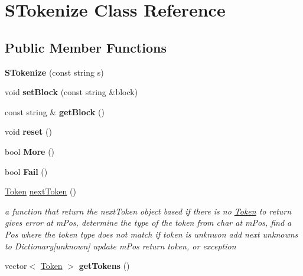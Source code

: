 \hypertarget{classSTokenize}{\section{S\-Tokenize Class Reference}
\label{classSTokenize}
}
\subsection*{Public Member Functions}
\begin{DoxyCompactItemize}
\item 
\hypertarget{classSTokenize_a6580cda9efc651908d5626b3e66a163c}{{\bfseries S\-Tokenize} (const string s)}\label{classSTokenize_a6580cda9efc651908d5626b3e66a163c}

\item 
\hypertarget{classSTokenize_ae0f9e9a36380b32b7d957649b246d3af}{void {\bfseries set\-Block} (const string \&block)}\label{classSTokenize_ae0f9e9a36380b32b7d957649b246d3af}

\item 
\hypertarget{classSTokenize_afebcdcb4e3710479e4ebec169aa379d6}{const string \& {\bfseries get\-Block} ()}\label{classSTokenize_afebcdcb4e3710479e4ebec169aa379d6}

\item 
\hypertarget{classSTokenize_adaa02543ad76313875bf18b9409a48c8}{void {\bfseries reset} ()}\label{classSTokenize_adaa02543ad76313875bf18b9409a48c8}

\item 
\hypertarget{classSTokenize_ae8e17715d0b292e35b2336a86aa5916e}{bool {\bfseries More} ()}\label{classSTokenize_ae8e17715d0b292e35b2336a86aa5916e}

\item 
\hypertarget{classSTokenize_ac90d384565139885b7946d1cc1077051}{bool {\bfseries Fail} ()}\label{classSTokenize_ac90d384565139885b7946d1cc1077051}

\item 
\hyperlink{classToken}{Token} \hyperlink{classSTokenize_af07af94359f0047076e07cac66598d81}{next\-Token} ()
\begin{DoxyCompactList}\small\item\em a function that return the next\-Token object based if there is no \hyperlink{classToken}{Token} to return gives error  at m\-Pos, determine the type of the token from char at m\-Pos, find a Pos where the token type does not match if token is unknwon add next unknowns to Dictionary\mbox{[}unknown\mbox{]} update m\-Pos return token, or exception \end{DoxyCompactList}\item 
\hypertarget{classSTokenize_a8e9f90d673b18047570f25cf8e855be3}{vector$<$ \hyperlink{classToken}{Token} $>$ {\bfseries get\-Tokens} ()}\label{classSTokenize_a8e9f90d673b18047570f25cf8e855be3}

\end{DoxyCompactItemize}
